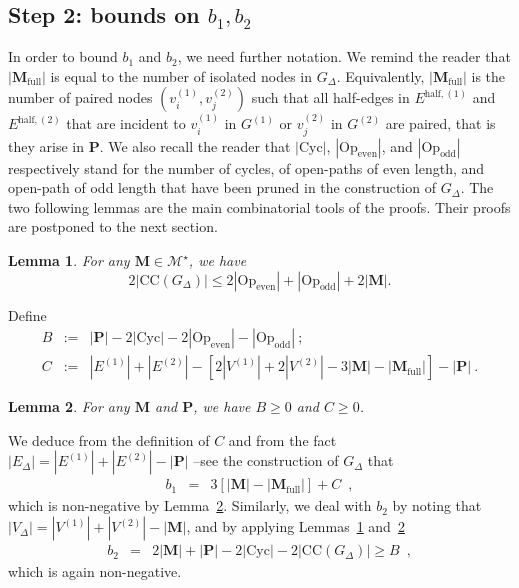 \documentclass{article}
\newtheorem{lemma}{Lemma}
\begin{document}
\subsection{Step 2: bounds on $b_1,b_2$}

In order to bound $b_1$ and $b_2$, we need further notation. We remind the reader that $|\mathbf{M}_{\mathrm{full}}|$ is equal to the number of isolated nodes in $G_{\Delta}$. Equivalently, $|\mathbf{M}_{\mathrm{full}}|$ is the number of paired nodes $(v^{(1)}_{i}, v^{(2)}_{j})$ such  that all half-edges in $E^{\mathrm{\mathrm{half}},(1)}$ and $E^{\mathrm{\mathrm{half}},(2)}$ that are incident to $v^{(1)}_{i}$ in $G^{(1)}$  or $v^{(2)}_{j}$ in $G^{(2)}$ are paired, that is they arise in $\mathbf{P}$. 
We also recall the reader that  $|\mathrm{Cyc}|$, $|\mathrm{Op}_{\mathrm{even}}|$, and $|\mathrm{Op}_{\mathrm{odd}}|$ respectively stand for the number of cycles, of open-paths of even length, and open-path of odd length that have been pruned in the construction of $G_{\Delta}$. 
The two following lemmas are the main combinatorial tools of the proofs. Their proofs are postponed to the next section. 
\begin{lemma}\label{lem:connected_components}
        For any $\mathbf{M}\in \mathcal{M}^{\star}$, we have 
        \[
            2 |\mathrm{CC}(G_{\Delta})| \leq 2|\mathrm{Op}_{\mathrm{even}}|+ |\mathrm{Op}_{\mathrm{odd}}|+ 2|\mathbf{M}|.
        \]
\end{lemma}


Define 
\begin{eqnarray}\label{eq:definition_B}
    B&:= &|\mathbf{P}| -  2|\mathrm{Cyc}| - 2|\mathrm{Op}_{\mathrm{even}}|- |\mathrm{Op}_{\mathrm{odd}}| \ ;\\
\label{eq:definition:C}
    C &:= &|E^{(1)}|+ |E^{(2)}| - [2|V^{(1)}| + 2|V^{(2)}|-3|\mathbf{M}|-|\mathbf{M}_{\mathrm{full}}|] - |\mathbf{P}|\ .
\end{eqnarray}

\begin{lemma}\label{lem:pairing}
   For any $\mathbf{M}$ and $\mathbf{P}$, we have $B\geq 0$ and $C\geq 0$.
    \end{lemma}
We deduce from the definition of $C$ and from the fact $|E_{\Delta}|= |E^{(1)}|+|E^{(2)}|- |\mathbf{P}|$ --see the construction of $G_{\Delta}$ 
 that 
\begin{eqnarray}
b_1 &= &3 [|\mathbf{M}|- |\mathbf{M}_{\mathrm{full}}|]+  C \enspace , 
\label{eq:b_1:bis} 
\end{eqnarray}
which is non-negative by Lemma~\ref{lem:pairing}. Similarly, we deal with $b_2$ by noting that $|V_{\Delta}|=|V^{(1)}|+|V^{(2)}|-|\mathbf{M}|$, and by applying Lemmas~\ref{lem:connected_components} and~\ref{lem:pairing}
\begin{eqnarray}\nonumber
    b_2 &= &2 |\mathbf{M}| + |\mathbf{P}| - 2|\mathrm{Cyc}| - 2|\mathrm{CC}(G_{\Delta})|  \geq  B  \label{eq:b_2:bis}\enspace ,
    \end{eqnarray}
    which is again non-negative.
\end{document}
